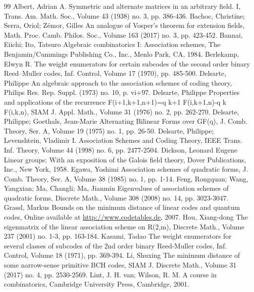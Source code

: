 \begin{thebibliography}{99}
 Albert, Adrian A. Symmetric and alternate matrices in an arbitrary field. I, Trans. Am. Math. Soc., Volume 43 (1938) no. 3, pp. 386-436.
 Bachoc, Christine; Serra, Oriol; Zémor, Gilles An analogue of Vosper’s theorem for extension fields, Math. Proc. Camb. Philos. Soc., Volume 163 (2017) no. 3, pp. 423-452.
 Bannai, Eiichi; Ito, Tatsuro Algebraic combinatorics I: Association schemes, The Benjamin/Cummings Publishing Co., Inc., Menlo Park, CA, 1984.
 Berlekamp, Elwyn R. The weight enumerators for certain subcodes of the second order binary Reed–Muller codes, Inf. Control, Volume 17 (1970), pp. 485-500.
 Delsarte, Philippe An algebraic approach to the association schemes of coding theory, Philips Res. Rep. Suppl. (1973) no. 10, p. vi+97.
 Delsarte, Philippe Properties and applications of the recurrence F(i+1,k+1,n+1)=q k+1 F(i,k+1,n)-q k F(i,k,n), SIAM J. Appl. Math., Volume 31 (1976) no. 2, pp. 262-270.
 Delsarte, Philippe; Goethals, Jean-Marie Alternating Bilinear Forms over GF(q), J. Comb. Theory, Ser. A, Volume 19 (1975) no. 1, pp. 26-50.
 Delsarte, Philippe; Levenshtein, Vladimir I. Association Schemes and Coding Theory, IEEE Trans. Inf. Theory, Volume 44 (1998) no. 6, pp. 2477-2504.
 Dickson, Leonard Eugene Linear groups: With an exposition of the Galois field theory, Dover Publications, Inc., New York, 1958.
 Egawa, Yoshimi Association schemes of quadratic forms, J. Comb. Theory, Ser. A, Volume 38 (1985) no. 1, pp. 1-14.
 Feng, Rongquan; Wang, Yangxian; Ma, Changli; Ma, Jianmin Eigenvalues of association schemes of quadratic forms, Discrete Math., Volume 308 (2008) no. 14, pp. 3023-3047.
 Grassl, Markus Bounds on the minimum distance of linear codes and quantum codes, Online available at \url{http://www.codetables.de,} 2007.
 Hou, Xiang-dong The eigenmatrix of the linear association scheme on R(2,m), Discrete Math., Volume 237 (2001) no. 1-3, pp. 163-184.
 Kasami, Tadao The weight enumerators for several classes of subcodes of the 2nd order binary Reed-Muller codes, Inf. Control, Volume 18 (1971), pp. 369-394.
 Li, Shuxing The minimum distance of some narrow-sense primitive BCH codes, SIAM J. Discrete Math., Volume 31 (2017) no. 4, pp. 2530-2569.
 Lint, J. H. van; Wilson, R. M. A course in combinatorics, Cambridge University Press, Cambridge, 2001.

\end{thebibliography}
